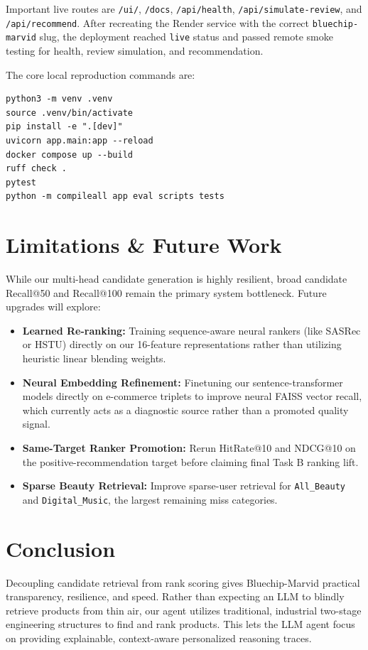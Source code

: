 \documentclass[11pt,a4paper]{article}
\begin{document}
Important live routes are \texttt{/ui/}, \texttt{/docs}, \texttt{/api/health}, \texttt{/api/simulate-review}, and \texttt{/api/recommend}. After recreating the Render service with the correct \texttt{bluechip-marvid} slug, the deployment reached \texttt{live} status and passed remote smoke testing for health, review simulation, and recommendation.

The core local reproduction commands are:
\begin{verbatim}
python3 -m venv .venv
source .venv/bin/activate
pip install -e ".[dev]"
uvicorn app.main:app --reload
docker compose up --build
ruff check .
pytest
python -m compileall app eval scripts tests
\end{verbatim}

\section{Limitations \& Future Work}
While our multi-head candidate generation is highly resilient, broad candidate Recall@50 and Recall@100 remain the primary system bottleneck. Future upgrades will explore:
\begin{itemize}
    \item \textbf{Learned Re-ranking:} Training sequence-aware neural rankers (like SASRec or HSTU) directly on our 16-feature representations rather than utilizing heuristic linear blending weights.
    \item \textbf{Neural Embedding Refinement:} Finetuning our sentence-transformer models directly on e-commerce triplets to improve neural FAISS vector recall, which currently acts as a diagnostic source rather than a promoted quality signal.
    \item \textbf{Same-Target Ranker Promotion:} Rerun HitRate@10 and NDCG@10 on the positive-recommendation target before claiming final Task B ranking lift.
    \item \textbf{Sparse Beauty Retrieval:} Improve sparse-user retrieval for \texttt{All\_Beauty} and \texttt{Digital\_Music}, the largest remaining miss categories.
\end{itemize}

\section{Conclusion}
Decoupling candidate retrieval from rank scoring gives Bluechip-Marvid practical transparency, resilience, and speed. Rather than expecting an LLM to blindly retrieve products from thin air, our agent utilizes traditional, industrial two-stage engineering structures to find and rank products. This lets the LLM agent focus on providing explainable, context-aware personalized reasoning traces.
\end{document}

